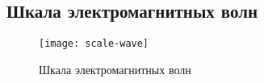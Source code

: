 \subsection{Шкала электромагнитных волн}
\begin{figure}[!h]
\centering
\texttt{[image: scale-wave]}
\caption{Шкала электромагнитных волн}
\end{figure}